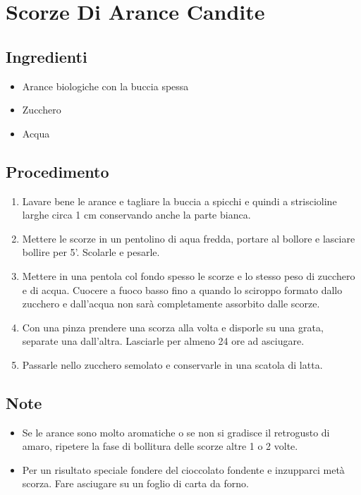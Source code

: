 \section{Scorze Di Arance Candite}
\subsection{Ingredienti}
\begin{itemize}
\item Arance biologiche con la buccia spessa  
\item Zucchero  
\item Acqua
\end{itemize}
\subsection{Procedimento}
\begin{enumerate}
\item  Lavare bene le arance e tagliare la buccia a spicchi e quindi a striscioline larghe circa 1 cm conservando anche la parte bianca.  
\item  Mettere le scorze in un pentolino di aqua fredda, portare al bollore e lasciare bollire per 5'. Scolarle e pesarle.  
\item  Mettere in una pentola col fondo spesso le scorze e lo stesso peso di zucchero e di acqua. Cuocere a fuoco basso fino a quando lo sciroppo formato dallo zucchero e dall'acqua non sarà completamente assorbito dalle scorze.  
\item  Con una pinza prendere una scorza alla volta e disporle su una grata, separate una dall'altra. Lasciarle per almeno 24 ore ad asciugare.  
\item  Passarle nello zucchero semolato e conservarle in una scatola di latta.
\end{enumerate}
\subsection{Note}
\begin{itemize}
\item Se le arance sono molto aromatiche o se non si gradisce il retrogusto di amaro, ripetere la fase di bollitura delle scorze altre 1 o 2 volte.  
\item Per un risultato speciale fondere del cioccolato fondente e inzupparci metà scorza. Fare asciugare su un foglio di carta da forno. 
\end{itemize}
